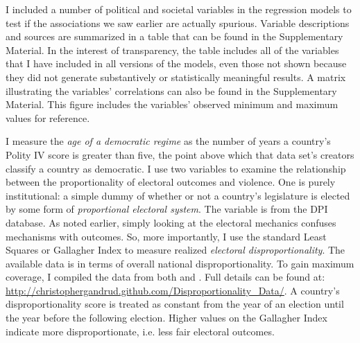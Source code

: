 \documentclass[a4paper]{article}\usepackage[]{graphicx}\usepackage[]{color}
\begin{document}
I included a number of political and societal variables in the regression models to test if the associations we saw earlier are actually spurious. Variable descriptions and sources are summarized in a table that can be found in the Supplementary Material. In the interest of transparency, the table includes all of the variables that I have included in all versions of the models, even those not shown because they did not generate substantively or statistically meaningful results. A matrix illustrating the variables' correlations can also be found in the Supplementary Material. This figure includes the variables' observed minimum and maximum values for reference.

I measure the {\emph{age of a democratic regime}} as the number of years a country's Polity IV score \citep{Marshall2009} is greater than five, the point above which that data set's creators classify a country as democratic. I use two variables to examine the relationship between the proportionality of electoral outcomes and violence. One is purely institutional: a simple dummy of whether or not a country's legislature is elected by some form of {\emph{proportional electoral system}}. The variable is from the DPI database. As noted earlier, simply looking at the electoral mechanics confuses mechanisms with outcomes. So, more importantly, I use the standard Least Squares or Gallagher Index \citep{Gallagher1991} to measure realized {\emph{electoral disproportionality}}. The available data is in terms of overall national disproportionality. To gain maximum coverage, I compiled the data from both \cite{Gallagher2012} and \cite{Carey2011}. Full details can be found at: \url{http://christophergandrud.github.com/Disproportionality_Data/}. A country's disproportionality score is treated as constant from the year of an election until the year before the following election. Higher values on the Gallagher Index indicate more disproportionate, i.e. less fair electoral outcomes.
\end{document}
